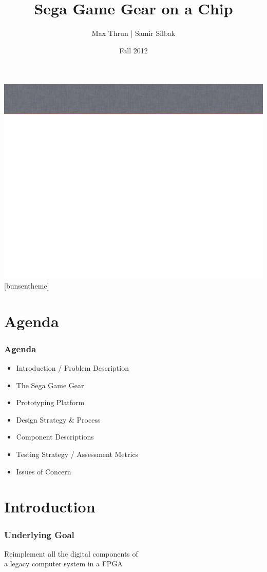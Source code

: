 \documentclass{beamer}
\title{Sega Game Gear on a Chip}
\author{Max Thrun | Samir Silbak}
\institute{University of Cincinnati}
\date{Fall 2012}
\newlength{\wideitemsep}
\let\olditem\item
\renewcommand{\item}{\setlength{\itemsep}{\wideitemsep}\olditem}
\begin{document}
\maketitle

%
%
{\includegraphics[width=\paperwidth,height=\paperheight]{slide_bg}}
[bunsentheme]

\section{Agenda}
\begin{frame}
\frametitle{Agenda}
    \begin{itemize}
        \item Introduction / Problem Description
        \item The Sega Game Gear
        \item Prototyping Platform
        \item Design Strategy \& Process
        \item Component Descriptions
        \item Testing Strategy / Assessment Metrics
        \item Issues of Concern
    \end{itemize}
\end{frame}

\section{Introduction}
\begin{frame}
\frametitle{Underlying Goal}
    \begin{center}
        \Large
        Reimplement all the digital components of \\a legacy computer system in a FPGA
    \end{center}
\end{frame}
\end{document}
